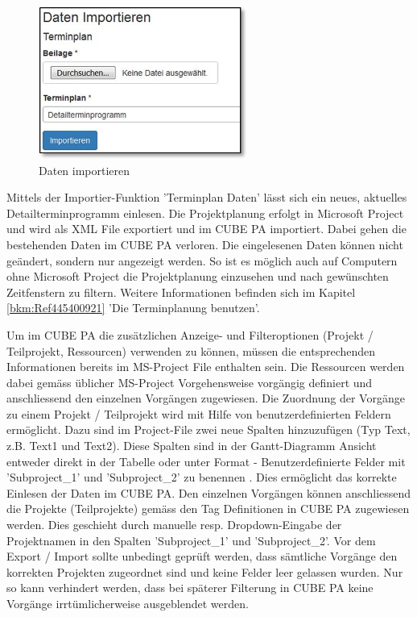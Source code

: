 \begin{figure}
\vspace{-15pt}
\includegraphics[height=50mm]{../chapters/12_Importieren/pictures/12-1_DatenImportieren.jpg}
\caption{Daten importieren}
\end{figure}
Mittels der Importier-Funktion 'Terminplan Daten' lässt sich ein neues, aktuelles Detailterminprogramm einlesen. Die Projektplanung erfolgt in Microsoft Project und wird als XML File exportiert und im CUBE PA importiert. Dabei gehen die bestehenden Daten im CUBE PA verloren. Die eingelesenen Daten können nicht geändert, sondern nur angezeigt werden. So ist es möglich auch auf Computern ohne Microsoft Project die Projektplanung einzusehen und nach gewünschten Zeitfenstern zu filtern. Weitere Informationen befinden sich im Kapitel \ref{bkm:Ref445400921} 'Die Terminplanung benutzen'.

\vspace{\baselineskip}

Um im CUBE PA die zusätzlichen Anzeige- und Filteroptionen (Projekt / Teilprojekt, Ressourcen) verwenden zu können, müssen die entsprechenden Informationen bereits im MS-Project File enthalten sein. Die Ressourcen werden dabei gemäss üblicher MS-Project Vorgehensweise vorgängig definiert und anschliessend den einzelnen Vorgängen zugewiesen. Die Zuordnung der Vorgänge zu einem Projekt / Teilprojekt wird mit Hilfe von benutzerdefinierten Feldern ermöglicht. Dazu sind im Project-File zwei neue Spalten hinzuzufügen (Typ Text, z.B. Text1 und Text2). Diese Spalten sind in der Gantt-Diagramm Ansicht entweder direkt in der Tabelle oder unter Format - Benutzerdefinierte Felder mit 'Subproject\_1' und 'Subproject\_2' zu benennen . Dies ermöglicht das korrekte Einlesen der Daten im CUBE PA. Den einzelnen Vorgängen können anschliessend die Projekte (Teilprojekte) gemäss den Tag Definitionen in CUBE PA zugewiesen werden. Dies geschieht durch manuelle resp. Dropdown-Eingabe der Projektnamen in den Spalten 'Subproject\_1' und 'Subproject\_2'. Vor dem Export / Import sollte unbedingt geprüft werden, dass sämtliche Vorgänge den korrekten Projekten zugeordnet sind und keine Felder leer gelassen wurden. Nur so kann verhindert werden, dass bei späterer Filterung in CUBE PA keine Vorgänge irrtümlicherweise ausgeblendet werden.

